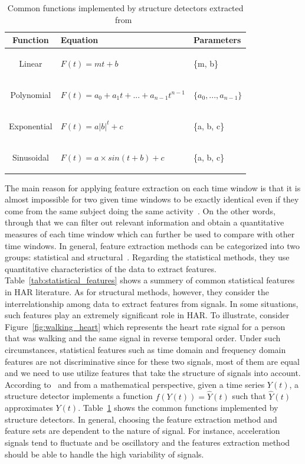 \begin{table}[h]
    \centering
\begin{tabular}{|c|>{\centering}m{8cm}|>{\centering}m{5cm}|}
\hline 
Function & Equation & Parameters\tabularnewline
\hline 
Linear &  \begin{center}
      $F(t)= mt + b$
 \end{center} & \{m, b\}\tabularnewline
Polynomial & \begin{center}
      $F(t)= a_0 + {a_1}t+ ... + a_{n-1}t^{n-1}$ \end{center} & 
      $\{a_0, ..., a_{n-1}\}$ \tabularnewline
Exponential &  \begin{center}
      $F(t)= a{|b|}^t + c$
 \end{center}  &\{a, b, c\}\tabularnewline
Sinusoidal & \begin{center}
      $F(t)= a \times sin(t + b )+ c$
 \end{center} & \{a, b, c\} \tabularnewline
\hline 
\end{tabular}
    \caption{Common functions implemented by structure detectors extracted from~\cite{lara2012survey}}
    \label{tab:structure_features}
\end{table}




The main reason for applying feature extraction on each time window is that it is almost impossible for two given time windows to be exactly identical even if they come from the same subject doing the same activity~\citep{lara2012survey}. On the other words, through that we can filter out relevant information and obtain a quantitative measures of each time window which can further be used to compare with other time windows. In general, feature extraction methods can be categorized into two groups: statistical
and structural~\citep{article}. Regarding the statistical methods, they use quantitative characteristics of the data to extract features. Table~\ref{tab:statistical_features} shows a summery of common statistical features in HAR literature. As for structural methods, however, they consider the interrelationship among data to extract features from signals. In some situations, such features play an extremely significant role in HAR. To illustrate, consider Figure~\ref{fig:walking_heart} which represents the heart rate signal for a person that was walking and the same signal in reverse temporal order. Under such circumstances, statistical features such as time domain and frequency domain features are not discriminative since for these two signals, most of them are equal and we need to use utilize features that take the structure of signals into account. According to~\cite{lara2012survey} and from a mathematical perspective, given a time series $Y(t)$, a structure detector implements a function $f(Y(t)) = \hat{Y}(t)$ such that $\hat{Y}(t)$ approximates $Y(t)$. Table~\ref{tab:structure_features} shows the common functions implemented by structure detectors. In general, choosing the feature extraction method and feature sets are dependent to the nature of signal. For instance, acceleration signals tend to fluctuate and be oscillatory and the features extraction method should be able to handle the high variability of signals.


